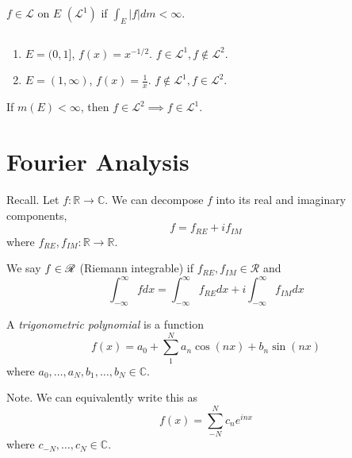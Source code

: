 \documentclass[11pt]{article}
\begin{document}
\begin{remark} $f \in \mathscr{L}$ on $E$ $(\mathscr{L}^1)$ if $\int_E |f| dm < \infty$.
\end{remark}

\begin{example} $\text{}$
  \begin{enumerate}
  \item $E = (0, 1]$, $f(x) = x^{-1/2}$. $f \in \mathscr{L}^1, f \notin \mathscr{L}^2$.
  \item $E = (1, \infty)$, $f(x) = \frac{1}{x}$. $f \notin \mathscr{L}^1, f \in \mathscr{L}^2$.
  \end{enumerate}
\end{example}

\begin{theorem} If $m(E) < \infty$, then $f \in \mathscr{L}^2 \implies f \in \mathscr{L}^1$.
\end{theorem}

\section{Fourier Analysis}

Recall. Let $f: \mathbb{R} \to \mathbb{C}$. We can decompose $f$ into its real and imaginary components, $$f = f_{RE} + i f_{IM}$$where $f_{RE}, f_{IM}: \mathbb{R} \to \mathbb{R}$.

We say $f \in \mathscr{R}$ (Riemann integrable) if $f_{RE}, f_{IM} \in \mathscr{R}$ and $$\int_{- \infty}^\infty f dx = \int_{- \infty}^\infty f_{RE} dx + i \int_{-\infty}^\infty f_{IM} dx$$

\begin{definition} A \emph{trigonometric polynomial} is a function $$f(x) = a_0 + \sum_1^N a_n \cos (nx) + b_n \sin (nx)$$ where $a_0, \dots, a_N, b_1, \dots, b_N \in \mathbb{C}$.
\end{definition}

Note. We can equivalently write this as $$f(x) = \sum_{-N}^N c_n e^{inx}$$ where $c_{-N}, \dots, c_N \in \mathbb{C}$. 
  
\end{document}
